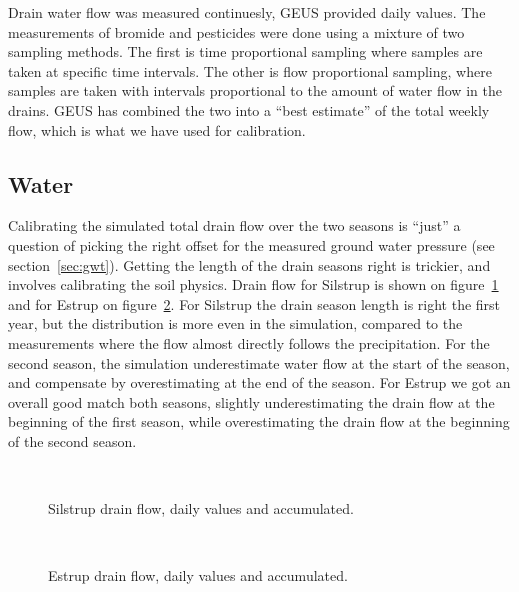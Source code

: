 Drain water flow was measured continuesly, GEUS provided daily values.
The measurements of bromide and pesticides were done using a mixture
of two sampling methods.  The first is time proportional sampling
where samples are taken at specific time intervals.  The other is flow
proportional sampling, where samples are taken with intervals
proportional to the amount of water flow in the drains.  GEUS has
combined the two into a ``best estimate'' of the total weekly flow,
which is what we have used for calibration.

\subsection{Water}

Calibrating the simulated total drain flow over the two seasons is
``just'' a question of picking the right offset for the measured
ground water pressure (see section~\ref{sec:gwt}).  Getting the length
of the drain seasons right is trickier, and involves calibrating the
soil physics.  Drain flow for Silstrup is shown on
figure~\ref{fig:Silstrup-drain} and for Estrup on
figure~\ref{fig:Estrup-drain}.  For Silstrup the drain season length
is right the first year, but the distribution is more even in the
simulation, compared to the measurements where the flow almost
directly follows the precipitation.  For the second season, the
simulation underestimate water flow at the start of the season, and
compensate by overestimating at the end of the season.  For Estrup we
got an overall good match both seasons, slightly underestimating the
drain flow at the beginning of the first season, while overestimating
the drain flow at the beginning of the second season.

\begin{figure}[htbp]
  \begin{center}
    \\
  \end{center}
  \caption{Silstrup drain flow, daily values and accumulated.}
  \label{fig:Silstrup-drain}
\end{figure}

\begin{figure}[htbp]
  \begin{center}
    \\
  \end{center}
  \caption{Estrup drain flow, daily values and accumulated.}
  \label{fig:Estrup-drain}
\end{figure}


